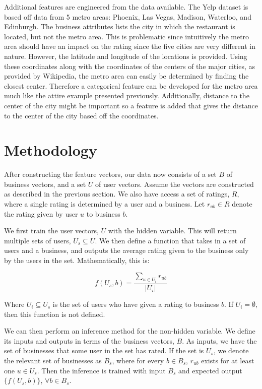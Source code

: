 \documentclass[11pt]{article}
\begin{document}
Additional features are engineered from the data available. The Yelp dataset is based off data from 5 metro areas: Phoenix, Las Vegas, Madison, Waterloo, and Edinburgh. The business attributes lists the city in which the restaurant is located, but not the metro area. This is problematic since intuitively the metro area should have an impact on the rating since the five cities are very different in nature. However, the latitude and longitude of the locations is provided. Using these coordinates along with the coordinates of the centers of the major cities, as provided by Wikipedia, the metro area can easily be determined by finding the closest center. Therefore a categorical feature can be developed for the metro area much like the attire example presented previously. Additionally, distance to the center of the city might be important so a feature is added that gives the distance to the center of the city based off the coordinates.

\section{Methodology}
After constructing the feature vectors, our data now consists of a set $B$ of business vectors, and a set $U$ of user vectors. Assume the vectors are constructed as described in the previous section. We also have access a set of ratings, $R$, where a single rating is determined by a user and a business. Let $r_{ub} \in R$ denote the rating given by user $u$ to business $b$.

We first train the user vectors, $U$ with the hidden variable. This will return multiple sets of users, $U_s \subseteq U$.  We then define a function that takes in a set of users and a business, and outputs the average rating given to the business only by the users in the set. Mathematically, this is:

\begin{equation}
\label{basic}
f(U_s, b) = \frac{\sum\limits_{u \in U_i} r_{ub}}{|U_i|}
\end{equation}

Where $U_i \subseteq U_s$ is the set of users who have given a rating to business $b$. If $U_i = \emptyset$, then this function is not defined. 

We can then perform an inference method for the non-hidden variable.  We define its inputs and outputs in terms of the business vectors, $B$. As inputs, we have the set of businesses that some user in the set has rated. If the set is $U_s$, we denote the relevant set of businesses as $B_s$, where for every $b \in B_s$, $r_{ub}$ exists for at least one $u \in U_s$. Then the inference is trained with input $B_s$ and expected output $\{f(U_s, b)\}$, $\forall b \in B_s$.
\end{document}
